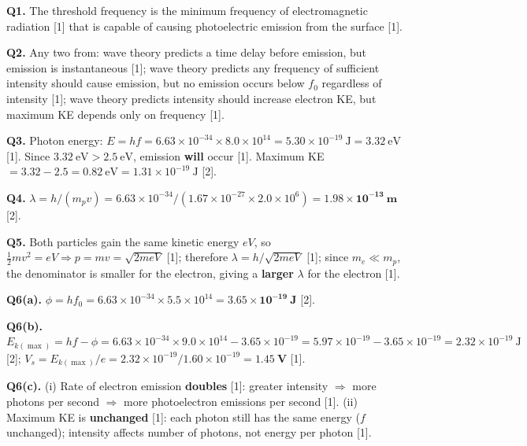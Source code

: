 \begin{markscheme}

\textbf{Q1.} The threshold frequency is the minimum frequency of electromagnetic radiation [1] that is capable of causing photoelectric emission from the surface [1].

\vspace{0.5em}\textbf{Q2.} Any two from: wave theory predicts a time delay before emission, but emission is instantaneous [1]; wave theory predicts any frequency of sufficient intensity should cause emission, but no emission occurs below $f_0$ regardless of intensity [1]; wave theory predicts intensity should increase electron KE, but maximum KE depends only on frequency [1].

\vspace{0.5em}\textbf{Q3.} Photon energy: $E = hf = 6.63\times10^{-34}\times8.0\times10^{14} = 5.30\times10^{-19}\ \text{J} = 3.32\ \text{eV}$ [1]. Since $3.32\ \text{eV} > 2.5\ \text{eV}$, emission \textbf{will} occur [1]. Maximum KE $= 3.32 - 2.5 = 0.82\ \text{eV} = 1.31\times10^{-19}\ \text{J}$ [2].

\vspace{0.5em}\textbf{Q4.} $\lambda = h/(m_p v) = 6.63\times10^{-34}/(1.67\times10^{-27}\times2.0\times10^6) = \mathbf{1.98\times10^{-13}\ \text{m}}$ [2].

\vspace{0.5em}\textbf{Q5.} Both particles gain the same kinetic energy $eV$, so $\tfrac{1}{2}mv^2 = eV \Rightarrow p = mv = \sqrt{2meV}$ [1]; therefore $\lambda = h/\sqrt{2meV}$ [1]; since $m_e \ll m_p$, the denominator is smaller for the electron, giving a \textbf{larger} $\lambda$ for the electron [1].

\vspace{0.5em}\textbf{Q6(a).} $\phi = hf_0 = 6.63\times10^{-34}\times5.5\times10^{14} = \mathbf{3.65\times10^{-19}\ \text{J}}$ [2].

\vspace{0.5em}\textbf{Q6(b).} $E_{k(\max)} = hf - \phi = 6.63\times10^{-34}\times9.0\times10^{14} - 3.65\times10^{-19} = 5.97\times10^{-19} - 3.65\times10^{-19} = 2.32\times10^{-19}\ \text{J}$ [2]; $V_s = E_{k(\max)}/e = 2.32\times10^{-19}/1.60\times10^{-19} = \mathbf{1.45\ \text{V}}$ [1].

\vspace{0.5em}\textbf{Q6(c).} (i) Rate of electron emission \textbf{doubles} [1]: greater intensity $\Rightarrow$ more photons per second $\Rightarrow$ more photoelectron emissions per second [1]. (ii) Maximum KE is \textbf{unchanged} [1]: each photon still has the same energy ($f$ unchanged); intensity affects number of photons, not energy per photon [1].


\end{markscheme}

